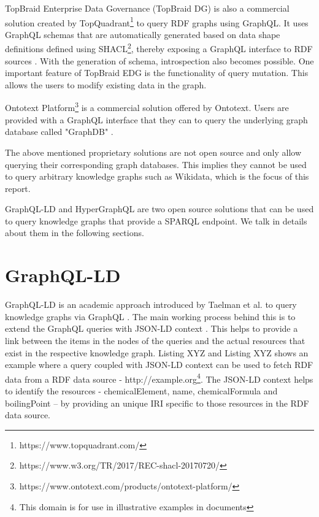 TopBraid Enterprise Data Governance (TopBraid DG) is also a commercial solution created by TopQuadrant\footnote{https://www.topquadrant.com/} to query RDF graphs using GraphQL. It uses GraphQL schemas that are automatically generated based on data shape definitions defined using SHACL\footnote{https://www.w3.org/TR/2017/REC-shacl-20170720/}, thereby exposing a GraphQL interface to RDF sources \cite{Taelman2019}. With the generation of schema, introspection also becomes possible. One important feature of TopBraid EDG is the functionality of query mutation. This allows the users to modify existing data in the graph.

Ontotext Platform\footnote{https://www.ontotext.com/products/ontotext-platform/} is a commercial solution offered by Ontotext. Users are provided with a GraphQL interface that they can to query the underlying graph database called "GraphDB" \cite{Angele2022}. 

The above mentioned proprietary solutions are not open source and only allow querying their corresponding graph databases. This implies they cannot be used to query arbitrary knowledge graphs such as Wikidata, which is the focus of this report.

GraphQL-LD and HyperGraphQL are two open source solutions that can be used to query knowledge graphs that provide a SPARQL endpoint. We talk in details about them in the following sections.

\section{GraphQL-LD}

GraphQL-LD is an academic approach introduced by Taelman et al. to query knowledge graphs via GraphQL \cite{Taelman2018}. The main working process behind this is to extend the GraphQL queries with JSON-LD context \cite{Sporny2014}. This helps to provide a link between the items in the nodes of the queries and the actual resources that exist in the respective knowledge graph. Listing XYZ and Listing XYZ shows an example where a query coupled with JSON-LD context can be used to fetch RDF data from a RDF data source - http://example.org\footnote{This domain is for use in illustrative examples in documents}. The JSON-LD context helps to identify the resources - chemicalElement, name, chemicalFormula and boilingPoint – by providing an unique IRI specific to those resources in the RDF data source.

